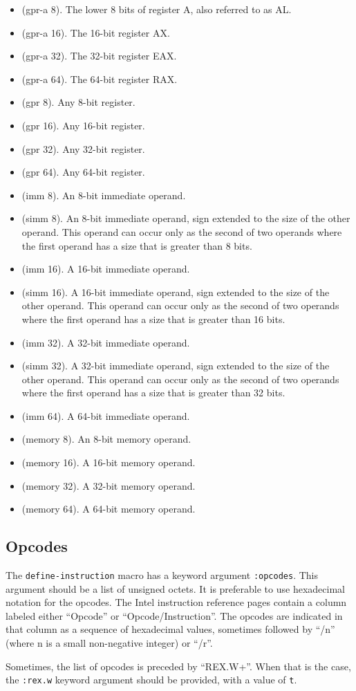 \begin{itemize}
\item (gpr-a 8).  The lower 8 bits of register A, also referred to as AL.
\item (gpr-a 16).  The 16-bit register AX.
\item (gpr-a 32).  The 32-bit register EAX.
\item (gpr-a 64).  The 64-bit register RAX.
\item (gpr 8).  Any 8-bit register.
\item (gpr 16).  Any 16-bit register.
\item (gpr 32).  Any 32-bit register.
\item (gpr 64).  Any 64-bit register.
\item (imm 8).  An 8-bit immediate operand.
\item (simm 8).  An 8-bit immediate operand, sign extended to the size
  of the other operand.  This operand can occur only as the second of
  two operands where the first operand has a size that is greater than
  8 bits.
\item (imm 16).  A 16-bit immediate operand.
\item (simm 16).  A 16-bit immediate operand, sign extended to the size
  of the other operand.  This operand can occur only as the second of
  two operands where the first operand has a size that is greater than
  16 bits.
\item (imm 32).  A 32-bit immediate operand.
\item (simm 32).  A 32-bit immediate operand, sign extended to the size
  of the other operand.  This operand can occur only as the second of
  two operands where the first operand has a size that is greater than
  32 bits.
\item (imm 64).  A 64-bit immediate operand.
\item (memory 8).  An 8-bit memory operand.
\item (memory 16).  A 16-bit memory operand.
\item (memory 32).  A 32-bit memory operand.
\item (memory 64).  A 64-bit memory operand.
\end{itemize}

\subsection{Opcodes}

The \texttt{define-instruction} macro has a keyword argument
\texttt{:opcodes}.  This argument should be a list of unsigned octets.
It is preferable to use hexadecimal notation for the opcodes.  The
Intel instruction reference pages contain a column labeled either
``Opcode'' or ``Opcode/Instruction''.  The opcodes are indicated in
that column as a sequence of hexadecimal values, sometimes followed by
``/n'' (where n is a small non-negative integer) or ``/r''.

Sometimes, the list of opcodes is preceded by ``REX.W+''.  When that
is the case, the \texttt{:rex.w} keyword argument should be provided,
with a value of \texttt{t}.

